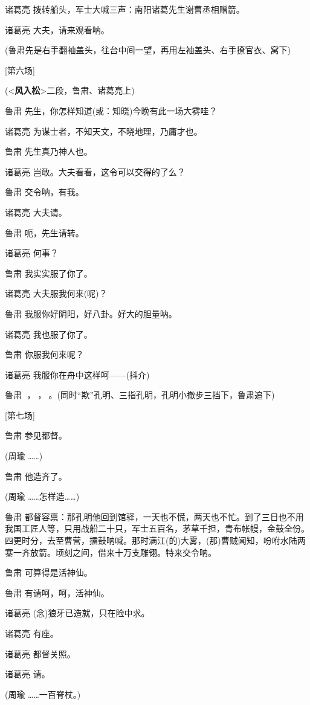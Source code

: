 诸葛亮 拨转船头，军士大喊三声：南阳诸葛先生谢曹丞相赠箭。

诸葛亮 大夫，请来观看呐。

(鲁肃先是右手翻袖盖头，往台中间一望，再用左袖盖头、右手撩官衣、窝下)

{[}第六场{]}

(\textless{}\textbf{风入松}\textgreater{}二段，鲁肃、诸葛亮上)

鲁肃 先生，你怎样知道(或：知晓)今晚有此一场大雾哇？

诸葛亮 为谋士者，不知天文，不晓地理，乃庸才也。

鲁肃 先生真乃神人也。

诸葛亮 岂敢。大夫看看，这令可以交得的了么？

鲁肃 交令呐，有我。

诸葛亮 大夫请。

鲁肃 呃，先生请转。

诸葛亮 何事？

鲁肃 我实实服了你了。

诸葛亮 大夫服我何来(呢)？

鲁肃 我服你好阴阳，好八卦。好大的胆量呐。

诸葛亮 我也服了你了。

鲁肃 你服我何来呢？

诸葛亮 我服你在舟中这样呵------(抖介)

鲁肃 𠳶，𠳶，𠳶。(同时``欺''孔明、三指孔明，孔明小撤步三挡下，鲁肃追下)

{[}第七场{]}

鲁肃 参见都督。

(周瑜 \ldots{}\ldots{})

鲁肃 他造齐了。

(周瑜 \ldots{}\ldots{}怎样造\ldots{}\ldots{})

鲁肃
都督容禀：那孔明他回到馆驿，一天也不慌，两天也不忙。到了三日也不用我国工匠人等，只用战船二十只，军士五百名，茅草千担，青布帐幔，金鼓全份。四更时分，去至曹营，擂鼓呐喊。那时满江(的)大雾，(那)曹贼闻知，吩咐水陆两寨一齐放箭。顷刻之间，借来十万支雕翎。特来交令呐。

鲁肃 可算得是活神仙。

鲁肃 有请呵，呵，活神仙。

诸葛亮 (念)狼牙已造就，只在险中求。

诸葛亮 有座。

诸葛亮 都督关照。

诸葛亮 请。

(周瑜 \ldots{}\ldots{}一百脊杖。)

